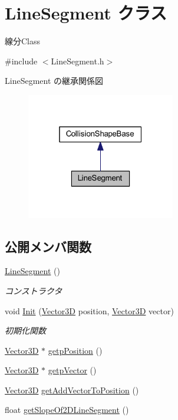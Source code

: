 \hypertarget{class_line_segment}{}\section{Line\+Segment クラス}
\label{class_line_segment}


線分\+Class  




{\ttfamily \#include $<$Line\+Segment.\+h$>$}



Line\+Segment の継承関係図\nopagebreak
\begin{figure}[H]
\begin{center}
\leavevmode
\includegraphics[width=184pt]{class_line_segment__inherit__graph}
\end{center}
\end{figure}
\subsection*{公開メンバ関数}
\begin{DoxyCompactItemize}
\item 
\mbox{\hyperlink{class_line_segment_a4c2da2ff2d3979f28bfcb24948a8e6a9}{Line\+Segment}} ()
\begin{DoxyCompactList}\small\item\em コンストラクタ \end{DoxyCompactList}\item 
void \mbox{\hyperlink{class_line_segment_a38c6ff9ade1d084219ea9c9ae88eb5c7}{Init}} (\mbox{\hyperlink{class_vector3_d}{Vector3D}} position, \mbox{\hyperlink{class_vector3_d}{Vector3D}} vector)
\begin{DoxyCompactList}\small\item\em 初期化関数 \end{DoxyCompactList}\item 
\mbox{\hyperlink{class_vector3_d}{Vector3D}} $\ast$ \mbox{\hyperlink{class_line_segment_a13877c27e539e948fe8db0f34853e3da}{getp\+Position}} ()
\item 
\mbox{\hyperlink{class_vector3_d}{Vector3D}} $\ast$ \mbox{\hyperlink{class_line_segment_a50ed66faa77529e1ef71bbc8714d7edc}{getp\+Vector}} ()
\item 
\mbox{\hyperlink{class_vector3_d}{Vector3D}} \mbox{\hyperlink{class_line_segment_af4c9249a6a1c6c75b12962ef29e6dd30}{get\+Add\+Vector\+To\+Position}} ()
\item 
float \mbox{\hyperlink{class_line_segment_a473738a0b67e449cf8b5a23f1146f446}{get\+Slope\+Of2\+D\+Line\+Segment}} ()
\end{DoxyCompactItemize}
